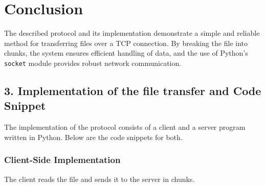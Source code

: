 \documentclass{article}
\begin{document}
\begin{center}
\end{center}

\section*{Conclusion}

The described protocol and its implementation demonstrate a simple and reliable method for transferring files over a TCP connection. By breaking the file into chunks, the system ensures efficient handling of data, and the use of Python's \texttt{socket} module provides robust network communication.

\subsection*{3. Implementation of the file transfer and Code Snippet}

The implementation of the protocol consists of a client and a server program written in Python. Below are the code snippets for both.

\subsubsection*{Client-Side Implementation}

The client reads the file and sends it to the server in chunks.
\end{document}
